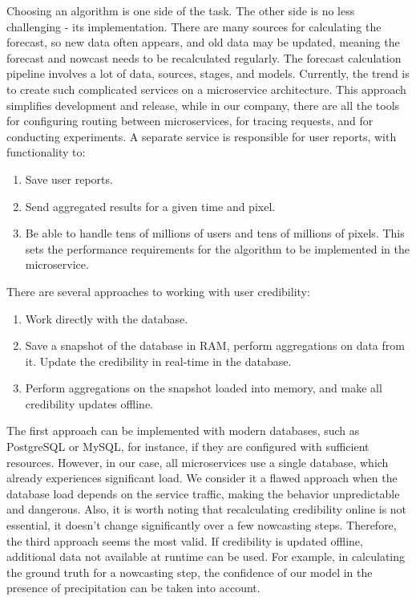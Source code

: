 \documentclass[conference]{IEEEtran}
\begin{document}
Choosing an algorithm is one side of the task. The other side is no less challenging - its implementation. There are many sources for calculating the forecast, so new data often appears, and old data may be updated, meaning the forecast and nowcast needs to be recalculated regularly. The forecast calculation pipeline involves a lot of data, sources, stages, and models. Currently, the trend is to create such complicated services on a microservice architecture. This approach simplifies development and release, while in our company, there are all the tools for configuring routing between microservices, for tracing requests, and for conducting experiments. A separate service is responsible for user reports, with functionality to:
\begin{enumerate}
	\item Save user reports.
	\item Send aggregated results for a given time and pixel.
	\item Be able to handle tens of millions of users and tens of millions of pixels. This sets the performance requirements for the algorithm to be implemented in the microservice.
\end{enumerate}

There are several approaches to working with user credibility:
\begin{enumerate}
	\item Work directly with the database.
	\item Save a snapshot of the database in RAM, perform aggregations on data from it. Update the credibility in real-time in the database.
	\item Perform aggregations on the snapshot loaded into memory, and make all credibility updates offline.
\end{enumerate}

The first approach can be implemented with modern databases, such as PostgreSQL or MySQL, for instance, if they are configured with sufficient resources. However, in our case, all microservices use a single database, which already experiences significant load. We consider it a flawed approach when the database load depends on the service traffic, making the behavior unpredictable and dangerous. Also, it is worth noting that recalculating credibility online is not essential, it doesn't change significantly over a few nowcasting steps. Therefore, the third approach seems the most valid. If credibility is updated offline, additional data not available at runtime can be used. For example, in calculating the ground truth for a nowcasting step, the confidence of our model in the presence of precipitation can be taken into account.
\end{document}
